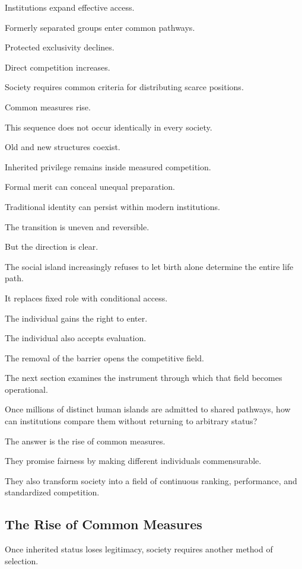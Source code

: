 Institutions expand effective access.

Formerly separated groups enter common pathways.

Protected exclusivity declines.

Direct competition increases.

Society requires common criteria for distributing scarce positions.

Common measures rise.

This sequence does not occur identically in every society.

Old and new structures coexist.

Inherited privilege remains inside measured competition.

Formal merit can conceal unequal preparation.

Traditional identity can persist within modern institutions.

The transition is uneven and reversible.

But the direction is clear.

The social island increasingly refuses to let birth alone determine the entire life path.

It replaces fixed role with conditional access.

The individual gains the right to enter.

The individual also accepts evaluation.

The removal of the barrier opens the competitive field.

The next section examines the instrument through which that field becomes operational.

Once millions of distinct human islands are admitted to shared pathways, how can institutions compare them without returning to arbitrary status?

The answer is the rise of common measures.

They promise fairness by making different individuals commensurable.

They also transform society into a field of continuous ranking, performance, and standardized competition.

\subsection*{\textbf{The Rise of Common Measures}}


Once inherited status loses legitimacy, society requires another method of selection.

